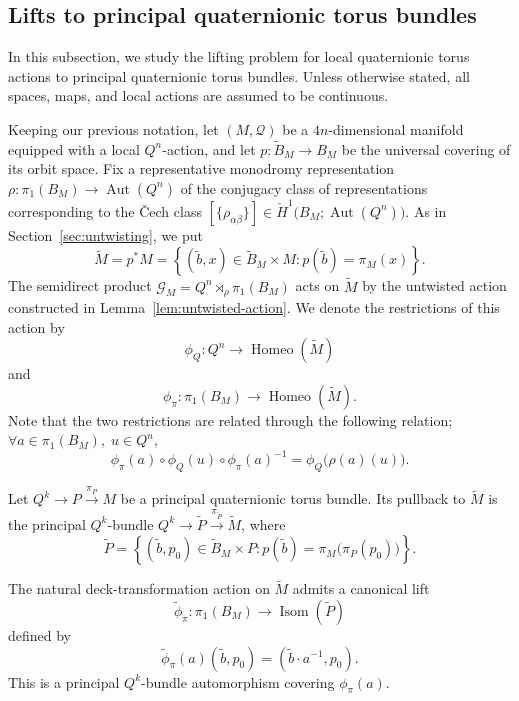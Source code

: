 \documentclass[11pt,a4paper]{article}
\numberwithin{equation}{section}
\theoremstyle{named}
\begin{document}
\subsection{Lifts to principal quaternionic torus bundles}
\label{sec:local-liftings}

In this subsection, we study the lifting problem for local quaternionic torus actions to principal quaternionic torus bundles. Unless otherwise stated, all spaces, maps, and local actions are assumed to be continuous.

\noindent Keeping our previous notation, let \((M,\mathcal Q)\) be a \(4n\)-dimensional manifold equipped with a local \(Q^n\)-action, and let $p:\widetilde B_M\longrightarrow B_M$
be the universal covering of its orbit space. Fix a representative monodromy representation $\rho:\pi_1(B_M)\longrightarrow \operatorname{Aut}(Q^n)$
of the conjugacy class of representations corresponding to the Čech class $[\{\rho_{\alpha\beta}\}]
\in
\check H^1\bigl(B_M;\operatorname{Aut}(Q^n)\bigr)$.
As in Section~\ref{sec:untwisting}, we put
\[
\widetilde M
=
p^*M
=
\left\{
(\widetilde b,x)\in \widetilde B_M\times M:
p(\widetilde b)=\pi_M(x)
\right\}.
\]
The semidirect product $\mathcal G_M=
Q^n\rtimes_\rho\pi_1(B_M)$
acts on \(\widetilde M\) by the untwisted action constructed in Lemma~\ref{lem:untwisted-action}. We denote the restrictions of this action by
\[
\phi_Q:Q^n\longrightarrow\operatorname{Homeo}(\widetilde M)
\]
and
\[
\phi_\pi:\pi_1(B_M)\longrightarrow\operatorname{Homeo}(\widetilde M).
\]
Note that the two restrictions are related through the following relation; $\forall a\in\pi_1(B_M),\;
u\in Q^n,$
\begin{equation}
\label{eq:base-semidir-compatibility}
\phi_\pi(a)\circ\phi_Q(u)\circ\phi_\pi(a)^{-1}
=
\phi_Q\bigl(\rho(a)(u)\bigr).
\end{equation}


Let $Q^k\longrightarrow P\overset{\pi_P}{\longrightarrow}M$
be a principal quaternionic torus bundle. Its pullback to \(\widetilde M\) is the principal \(Q^k\)-bundle $Q^k\longrightarrow
\widetilde P
\overset{\pi_{\widetilde P}}{\longrightarrow}
\widetilde M$,
where
\[
\widetilde P
=
\left\{
(\widetilde b,p_0)\in\widetilde B_M\times P:
p(\widetilde b)=\pi_M\bigl(\pi_P(p_0)\bigr)
\right\}.
\]

The natural deck-transformation action on \(\widetilde M\) admits a canonical lift
\[
\widetilde\phi_\pi:
\pi_1(B_M)
\longrightarrow
\operatorname{Isom}(\widetilde P)
\]
defined by
\[
\widetilde\phi_\pi(a)(\widetilde b,p_0)
=
(\widetilde b\cdot a^{-1},p_0).
\]
This is a principal \(Q^k\)-bundle automorphism covering
\(\phi_\pi(a)\).
\end{document}
